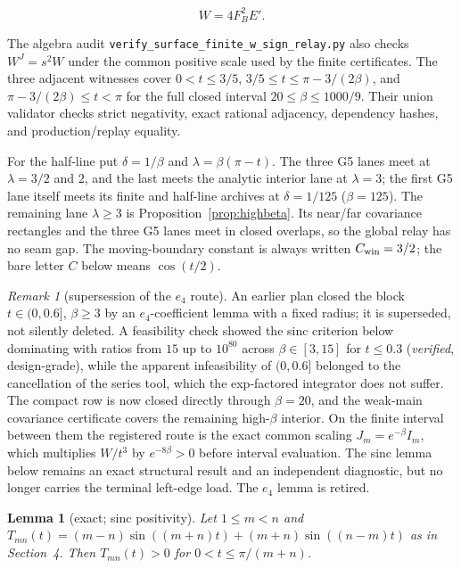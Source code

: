 \documentclass[11pt]{article}
\newtheorem{lemma}[theorem]{Lemma}
\theoremstyle{remark}
\newtheorem{remark}[theorem]{Remark}
\newcommand{\FB}{F_{\!B}}
\begin{document}
\[
  W=4\FB^2E'.
\]

The algebra audit
\texttt{verify\_surface\_finite\_w\_sign\_relay.py} also checks
$W^J=s^2W$ under the common positive scale used by the finite
certificates.  The three adjacent witnesses cover
$0<t\le3/5$, $3/5\le t\le\pi-3/(2\beta)$, and
$\pi-3/(2\beta)\le t<\pi$ for the full closed interval
$20\le\beta\le1000/9$.  Their union validator checks strict negativity,
exact rational adjacency, dependency hashes, and production/replay
equality.

For the half-line put $\delta=1/\beta$ and
$\lambda=\beta(\pi-t)$.  The three G5 lanes meet at
$\lambda=3/2$ and $2$, and the last meets the analytic interior lane at
$\lambda=3$; the first G5 lane itself meets its finite and half-line
archives at $\delta=1/125$ \textup{(}$\beta=125$\textup{)}.  The
remaining lane $\lambda\ge3$ is Proposition~\ref{prop:highbeta}.
Its near/far covariance rectangles and the three G5 lanes meet in closed
overlaps, so the global relay has no seam gap.  The moving-boundary constant is
always written $C_{\rm win}=3/2$; the bare letter $C$ below means
$\cos(t/2)$.

\begin{remark}[supersession of the $e_4$ route]\label{rem:e4dead}
An earlier plan closed the block $t\in(0,0.6]$, $\beta\ge3$ by an
$e_4$-coefficient lemma with a fixed radius; it is superseded, not
silently deleted. A feasibility check showed the sinc criterion below
dominating with ratios from $15$ up to $10^{80}$ across
$\beta\in[3,15]$ for $t\le0.3$ (\emph{verified}, design-grade), while
the apparent infeasibility of $(0,0.6]$ belonged to the cancellation
of the series tool, which the exp-factored integrator does not
suffer.  The compact row is now closed directly through $\beta=20$, and
the weak-main covariance certificate covers the remaining high-$\beta$
interior.  On the finite
interval between them the registered
route is the exact common scaling $J_m=e^{-\beta}I_m$, which multiplies
$W/t^3$ by $e^{-8\beta}>0$ before interval evaluation.  The sinc lemma
below remains an exact structural result and an independent diagnostic, but
no longer carries the terminal left-edge load.  The $e_4$ lemma is retired.
\end{remark}

\begin{lemma}[exact; sinc positivity]\label{lem:sinc}
Let $1\le m<n$ and $T_{mn}(t)=(m-n)\sin((m+n)t)+(m+n)\sin((n-m)t)$
as in Section~\textup{4}. Then $T_{mn}(t)>0$ for
$0<t\le\pi/(m+n)$.
\end{lemma}
\end{document}
